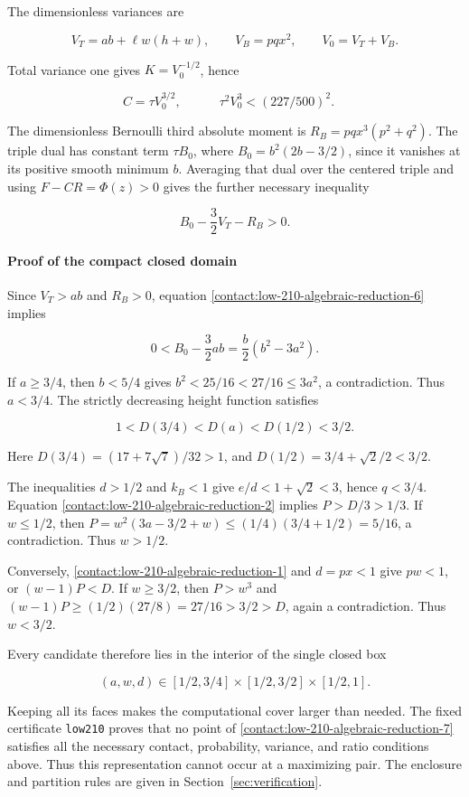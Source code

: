 The dimensionless variances are

\[
 V_T=ab+\ell w(h+w),\qquad V_B=pq x^2,\qquad V_0=V_T+V_B.
\]

Total variance one gives $K=V_0^{-1/2}$, hence

\[
 C=\tau V_0^{3/2},\qquad
 \boxed{\quad \tau^2V_0^3<(227/500)^2.\quad}
\tag{B.12.5}\label{contact:low-210-algebraic-reduction-5}
\]

The dimensionless Bernoulli third absolute moment is
$R_B=pq x^3(p^2+q^2)$. The triple dual has constant term
$\tau B_0$, where $B_0=b^2(2b-3/2)$, since it vanishes at its positive
smooth minimum $b$. Averaging that dual over the centered triple and
using $F-CR=\Phi(z)>0$ gives the further necessary inequality

\[
 \boxed{\quad B_0-\frac32 V_T-R_B>0.\quad}
\tag{B.12.6}\label{contact:low-210-algebraic-reduction-6}
\]

\paragraph{Proof of the compact closed domain}

Since $V_T>ab$ and $R_B>0$, equation \eqref{contact:low-210-algebraic-reduction-6} implies

\[
 0<B_0-\frac32ab=\frac{b}{2}(b^2-3a^2).
\]

If $a\ge 3/4$, then $b<5/4$ gives
$b^2<25/16<27/16\le 3a^2$, a contradiction. Thus $a<3/4$.
The strictly decreasing height function satisfies

\[
 1<D(3/4)<D(a)<D(1/2)<3/2.
\]

Here $D(3/4)=(17+7\sqrt{7})/32>1$, and
$D(1/2)=3/4+\sqrt{2}/2<3/2$.

The inequalities $d>1/2$ and $k_B<1$ give
$e/d<1+\sqrt{2}<3$, hence $q<3/4$. Equation \eqref{contact:low-210-algebraic-reduction-2} implies
$P>D/3>1/3$. If $w\le 1/2$, then
$P=w^2(3a-3/2+w)\le (1/4)(3/4+1/2)=5/16$, a contradiction.
Thus $w>1/2$.

Conversely, \eqref{contact:low-210-algebraic-reduction-1} and $d=px<1$ give $pw<1$, or $(w-1)P<D$.
If $w\ge 3/2$, then $P>w^3$ and
$(w-1)P\ge (1/2)(27/8)=27/16>3/2>D$, again a contradiction.
Thus $w<3/2$.

Every candidate therefore lies in the interior of the single closed box

\[
 \boxed{\quad (a,w,d)\in[1/2,3/4]\times[1/2,3/2]\times[1/2,1].\quad}
\tag{B.12.7}\label{contact:low-210-algebraic-reduction-7}
\]

Keeping all its faces makes the computational cover larger than needed.
The fixed certificate \texttt{low210} proves that no point of
\eqref{contact:low-210-algebraic-reduction-7} satisfies all the necessary
contact, probability, variance, and ratio conditions above. Thus this
representation cannot occur at a maximizing pair. The enclosure and
partition rules are given in Section~\ref{sec:verification}.
